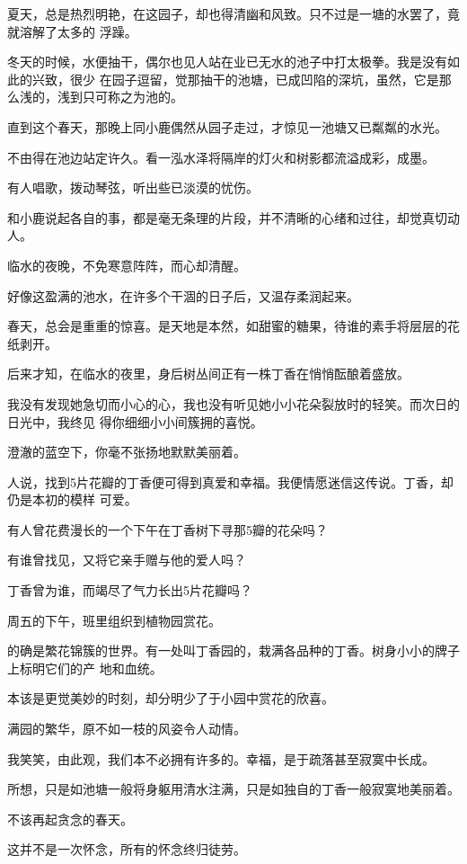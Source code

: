 \documentclass[12pt,a4paper]{article}
\begin{document}
		夏天，总是热烈明艳，在这园子，却也得清幽和风致。只不过是一塘的水罢了，竟就溶解了太多的
	浮躁。

		冬天的时候，水便抽干，偶尔也见人站在业已无水的池子中打太极拳。我是没有如此的兴致，很少
	在园子逗留，觉那抽干的池塘，已成凹陷的深坑，虽然，它是那么浅的，浅到只可称之为池的。

		直到这个春天，那晚上同小鹿偶然从园子走过，才惊见一池塘又已粼粼的水光。

		不由得在池边站定许久。看一泓水泽将隔岸的灯火和树影都流溢成彩，成墨。

		有人唱歌，拨动琴弦，听出些已淡漠的忧伤。

		和小鹿说起各自的事，都是毫无条理的片段，并不清晰的心绪和过往，却觉真切动人。

		临水的夜晚，不免寒意阵阵，而心却清醒。

		好像这盈满的池水，在许多个干涸的日子后，又温存柔润起来。

		春天，总会是重重的惊喜。是天地是本然，如甜蜜的糖果，待谁的素手将层层的花纸剥开。

		后来才知，在临水的夜里，身后树丛间正有一株丁香在悄悄酝酿着盛放。

		我没有发现她急切而小心的心，我也没有听见她小小花朵裂放时的轻笑。而次日的日光中，我终见
	得你细细小小间簇拥的喜悦。

		澄澈的蓝空下，你毫不张扬地默默美丽着。

		人说，找到5片花瓣的丁香便可得到真爱和幸福。我便情愿迷信这传说。丁香，却仍是本初的模样
	可爱。

		有人曾花费漫长的一个下午在丁香树下寻那5瓣的花朵吗？

		有谁曾找见，又将它亲手赠与他的爱人吗？

		丁香曾为谁，而竭尽了气力长出5片花瓣吗？

		周五的下午，班里组织到植物园赏花。

		的确是繁花锦簇的世界。有一处叫丁香园的，栽满各品种的丁香。树身小小的牌子上标明它们的产
	地和血统。

		本该是更觉美妙的时刻，却分明少了于小园中赏花的欣喜。

		满园的繁华，原不如一枝的风姿令人动情。

		我笑笑，由此观，我们本不必拥有许多的。幸福，是于疏落甚至寂寞中长成。

		所想，只是如池塘一般将身躯用清水注满，只是如独自的丁香一般寂寞地美丽着。

		不该再起贪念的春天。

		这并不是一次怀念，所有的怀念终归徒劳。
\end{document}
